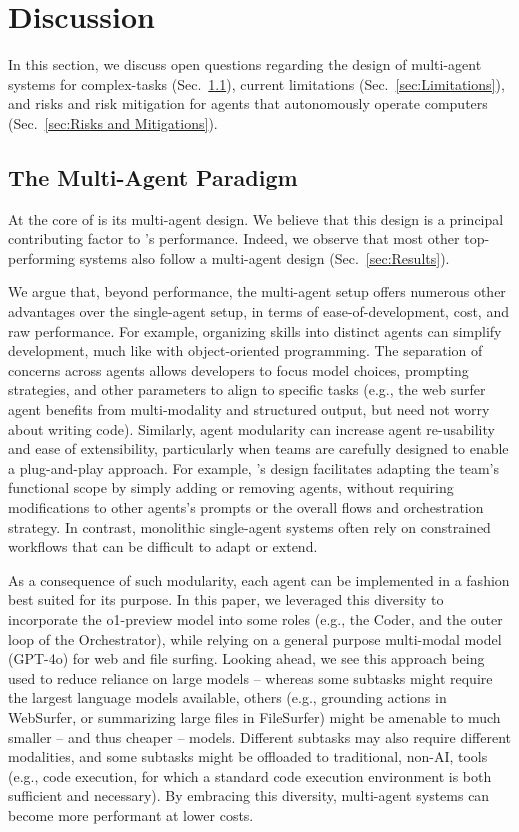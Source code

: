 \section{Discussion}
In this section, we discuss
open questions regarding the design of multi-agent systems for complex-tasks (Sec.~\ref{sec:The Multi-Agent Paradigm}),
current limitations (Sec.~\ref{sec:Limitations}),
and risks and risk mitigation for agents that autonomously operate computers (Sec.~\ref{sec:Risks and Mitigations}).

\subsection{The Multi-Agent Paradigm}
\label{sec:The Multi-Agent Paradigm}

At the core of \team is its multi-agent design.
We believe that this design is a principal contributing factor to \team's performance.
Indeed, we observe that most other top-performing systems also follow a multi-agent design (Sec.~\ref{sec:Results}).

We argue that, beyond performance, the multi-agent setup offers numerous other advantages over the single-agent setup, in terms of ease-of-development, cost, and raw performance. 
For example, organizing skills into distinct agents can simplify development, much like with object-oriented programming. The separation of concerns across agents allows developers to focus model choices, prompting strategies, and other parameters to align to specific tasks (e.g., the web surfer agent benefits from multi-modality and structured output, but need not worry about writing code). Similarly, agent modularity can increase agent re-usability and ease of extensibility, particularly when teams are carefully designed to enable a plug-and-play approach. For example, \team's design facilitates adapting the team's functional scope by simply adding or removing agents, without requiring modifications to other agents's prompts or the overall flows and orchestration strategy. In contrast, monolithic single-agent systems often rely on constrained workflows that can be difficult to adapt or extend.

As a consequence of such modularity, each agent can be implemented in a fashion best suited for its purpose. In this paper, we leveraged this diversity to incorporate the o1-preview model into some roles (e.g., the Coder, and the outer loop  of the Orchestrator), while relying on a general purpose multi-modal model (GPT-4o) for web and file surfing. Looking ahead, we see this approach being used to reduce reliance on large models --  whereas some subtasks might require the largest language models available, others (e.g., grounding actions in WebSurfer, or summarizing large files in FileSurfer) might be amenable to much smaller -- and thus cheaper -- models. Different subtasks may also require different modalities, and some subtasks might be offloaded to traditional, non-AI, tools (e.g., code execution, for which a standard code execution environment is both sufficient and necessary). By embracing this diversity, multi-agent systems can become more performant at lower costs.


